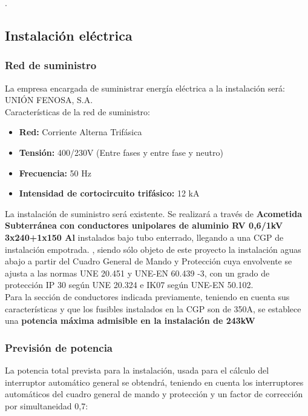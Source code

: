 \hfill.
\newpage
	
\subsection{Instalación eléctrica}

\subsubsection{Red de suministro}

La empresa encargada de suministrar energía eléctrica a la instalación será:\\
UNIÓN FENOSA, S.A.\\

Características de la red de suministro:\

\begin{itemize}
\item {\bfseries Red:} Corriente Alterna Trifásica 
\item {\bfseries Tensión:} 400/230V (Entre fases y entre fase y neutro)
\item {\bfseries Frecuencia:} 50 Hz
\item {\bfseries Intensidad de cortocircuito trifásico:} 12 kA
\end{itemize}

La instalación de suministro será existente. Se realizará a través de {\bfseries Acometida Subterránea con conductores unipolares de aluminio RV 0,6/1kV 3x240+1x150 Al} instalados bajo tubo enterrado, llegando a una CGP de instalación empotrada. , siendo sólo objeto de este proyecto la instalación aguas abajo a partir del Cuadro General de Mando y Protección cuya envolvente se ajusta a las normas UNE 20.451 y UNE-EN 60.439 -3, con un grado de protección IP 30 según UNE 20.324 e IK07 según UNE-EN 50.102.\\

Para la sección de conductores indicada previamente, teniendo en cuenta sus características y que los fusibles instalados en la CGP son de 350A, se establece una {\bfseries potencia máxima admisible en la instalación de 243kW}

\subsubsection{Previsión de potencia}

La potencia total prevista para la instalación, usada para el cálculo del interruptor automático general se obtendrá, teniendo en cuenta los interruptores automáticos del cuadro general de mando y protección y un factor de corrección por simultaneidad 0,7:

